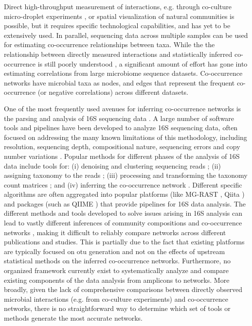  Direct high-throughput measurement of interactions, e.g. through co-culture micro-droplet experiments \cite{Hsu2019,Jian2020}, or spatial visualization of natural communities \cite{Wilbert2020} is possible, but it requires specific technological capabilities, and has yet to be extensively used.
 In parallel, sequencing data across multiple samples can be used for estimating co-occurrence relationships between taxa.
 While the the relationship between directly measured interactions and statistically inferred co-occurrence is still poorly understood \cite{Zuniga2017}, a significant amount of effort has gone into estimating correlations from large microbiome sequence datasets.
 Co-occurrence networks have microbial taxa as nodes, and edges that represent the frequent co-occurrence (or negative correlations) across different datasets. 

One of the most frequently used avenues for inferring co-occurrence networks is the parsing and analysis of 16S sequencing data \cite{Rottjers2018,Friedman2012}. A large number of software tools and pipelines have been developed to analyze 16S sequencing data, often focused on addressing the many known limitations of this methodology, including resolution, sequencing depth, compositional nature, sequencing errors and copy number variations \cite{Bharti2019,Pollock2018}. Popular methods for different phases of the analysis of 16S data include tools for: (i) denoising and clustering sequencing reads \cite{Caporaso2010,Callahan2016}; (ii) assigning taxonomy to the reads \cite{DeSantis2006,Quast2012}; (iii) processing and transforming the taxonomy count matrices \cite{Weiss2015}; and (iv) inferring the co-occurrence network \cite{Cougoul2019,Kurtz2015}.
Different specific algorithms are often aggregated into popular platforms (like MG-RAST \cite{Keegan2016}, Qiita \cite{qiita}) and packages (such as QIIME \cite{Caporaso2010}) that provide pipelines for 16S data analysis.
The different methods and tools developed to solve issues arising in 16S analysis can lead to vastly different inferences of community compositions and co-occurrence networks \cite{Golob2017,Weiss2016}, making it difficult to reliably compare networks across different publications and studies.
 This is partially due to the fact that existing platforms are typically focused on \ac{otu} generation and not on the effects of upstream statistical methods on the inferred co-occurrence networks.
 Furthermore, no organized framework currently exist to systematically analyze and compare existing components of the data analysis from amplicons to networks.
  More broadly, given the lack of comprehensive comparisons between directly observed microbial interactions (e.g. from co-culture experiments) and co-occurrence networks, there is no straightforward way to determine which set of tools or methods generate the most accurate networks.
 
